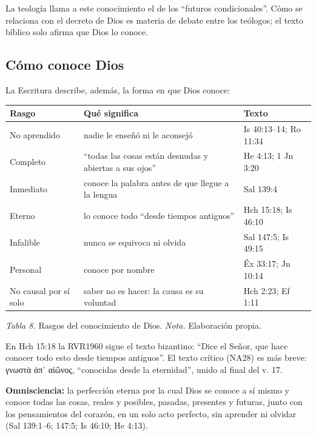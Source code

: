 \documentclass[11pt,letterpaper]{article}
\newcommand{\grc}[1]{\foreignlanguage{ancientgreek}{#1}}
\begin{document}
\begin{nota}[Precisión]
La teología llama a este conocimiento el de los ``futuros condicionales''. Cómo se relaciona con el decreto de Dios es materia de debate entre los teólogos; el texto bíblico solo afirma que Dios lo conoce.
\end{nota}

\subsection{Cómo conoce Dios}
La Escritura describe, además, la forma en que Dios conoce:

\begin{center}\small\renewcommand{\arraystretch}{1.25}
\begin{tabular}{@{}L{3.0cm}L{7.0cm}L{4.4cm}@{}}
\toprule
\textbf{Rasgo} & \textbf{Qué significa} & \textbf{Texto} \\ \midrule
No aprendido & nadie le enseñó ni le aconsejó & Is 40:13--14; Ro 11:34 \\
Completo & ``todas las cosas están desnudas y abiertas a sus ojos'' & He 4:13; 1 Jn 3:20 \\
Inmediato & conoce la palabra antes de que llegue a la lengua & Sal 139:4 \\
Eterno & lo conoce todo ``desde tiempos antiguos'' & Hch 15:18; Is 46:10 \\
Infalible & nunca se equivoca ni olvida & Sal 147:5; Is 49:15 \\
Personal & conoce por nombre & Éx 33:17; Jn 10:14 \\
No causal por sí solo & saber no es hacer: la causa es su voluntad & Hch 2:23; Ef 1:11 \\
\bottomrule
\end{tabular}\par
{\footnotesize\color{gris}\textit{Tabla 8.} Rasgos del conocimiento de Dios. \textit{Nota.} Elaboración propia.}
\end{center}

\begin{nota}
En Hch 15:18 la RVR1960 sigue el texto bizantino: ``Dice el Señor, que hace conocer todo esto desde tiempos antiguos''. El texto crítico (NA28) es más breve: \grc{γνωστὰ ἀπ᾽ αἰῶνος}, ``conocidas desde la eternidad'', unido al final del v. 17.
\end{nota}

\begin{tcolorbox}[colback=papiro,colframe=azul,boxrule=1pt,arc=3pt]
\textbf{Omnisciencia:} la perfección eterna por la cual Dios se conoce a sí mismo y conoce todas las cosas, reales y posibles, pasadas, presentes y futuras, junto con los pensamientos del corazón, en un solo acto perfecto, sin aprender ni olvidar (Sal 139:1--6; 147:5; Is 46:10; He 4:13).
\end{tcolorbox}
\end{document}
